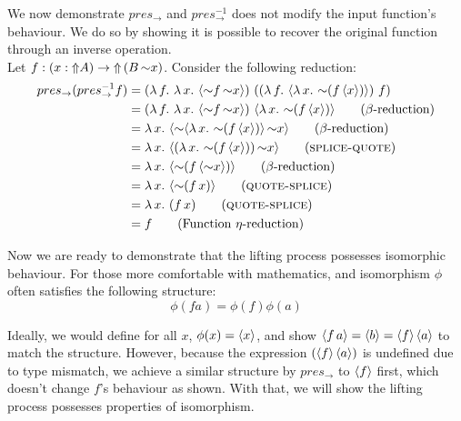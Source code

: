 \begin{remark}
    We now demonstrate $pres_\to$ and $pres_\to^{-1}$ does not modify the input function's behaviour. We do so by showing it is possible to recover the original function through an inverse operation. \\
    Let $f: (x : {\Uparrow} A) \to {\Uparrow}\,(B\,{\sim} x)$. Consider the following reduction:\\
    \begin{align*}
      pres_\to (pres_\to^{-1} f)
      &=(\lambda\,f. \,\,\lambda\,x.\,\,\qut{\spl f\,\spl x})\,\, ((\lambda\,f.\,\,\qut{\lambda\,x.\,\,\spl(f\,\qut{x})})\,\, f) \\
      &= (\lambda\,f.\,\,\lambda\,x.\,\,\qut{\spl f\,\spl x})\,\, \qut{\lambda\,x.\,\,\spl(f\,\qut{x})} \tag{$\beta$-reduction}\\
      &= \lambda\,x.\,\,\qut{\spl \qut{\lambda\,x.\,\,\spl(f\,\qut{x})}\,\spl x} \tag{$\beta$-reduction}\\
      &= \lambda\,x.\,\,\qut{(\lambda\,x.\,\,\spl(f\,\qut{x}))\,\spl x} \tag{\textsc{splice-quote}}\\
      &= \lambda\,x.\,\,\qut{\spl(f\,\qut{\spl x})} \tag{$\beta$-reduction}\\
      &= \lambda\,x.\,\,\qut{\spl(f\, x)} \tag{\textsc{quote-splice}}\\
      &= \lambda\,x.\,\,(f\, x) \tag{\textsc{quote-splice}}\\
      &= f \tag{Function $\eta$-reduction}
    \end{align*}
\end{remark}


\smallskip
Now we are ready to demonstrate that the lifting process possesses isomorphic behaviour. For those more comfortable with mathematics, and isomorphism $\phi$ often satisfies the following structure: 
$$\phi(fa) = \phi(f)\phi(a)$$

Ideally, we would define for all $x$, $\phi(x) = \langle x\rangle$, and show $\langle f\, a\rangle = \langle b\rangle = \langle f\rangle\,\langle a\rangle$ to match the structure. However, because the expression  $(\langle f\rangle\,\langle a\rangle)$ is undefined due to type mismatch, we achieve a similar structure by $pres_\to$ to $\langle f\rangle$ first, which doesn't change $f$'s behaviour as shown. With that, we will show the lifting process possesses properties of isomorphism.

